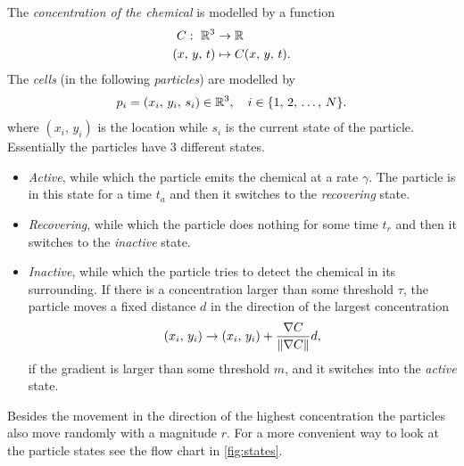 \documentclass{class}
\begin{document}
The \emph{concentration of the chemical} is modelled by a function
\begin{align*}
    C:\ 
    \R^3&\to\R\\
    (x,\,y,\,t)&\mapsto C(x,\,y,\,t).
\end{align*}
The \emph{cells} (in the following \emph{particles}) are modelled by
\begin{align*}
    p_i=(x_i,\,y_i,\,s_i)\in\mathbb{R}^3,\quad i\in\{1,\,2,\,\ldots,\,N\}.
\end{align*}
where $(x_i,\,y_i)$ is the location while $s_i$ is the current state of the particle.
Essentially the particles have 3 different states.
\begin{itemize}
    \item \emph{Active}, while which the particle emits the chemical at a rate $\gamma$.
          The particle is in this state for a time $t_a$ and then it switches to the \emph{recovering} state.
    \item \emph{Recovering}, while which the particle does nothing for some time $t_r$ and then it switches to the
          \emph{inactive} state.
    \item \emph{Inactive}, while which the particle tries to detect the chemical in its surrounding.
          If there is a concentration larger than some threshold $\tau$, the particle moves a fixed distance $d$ in the direction of the largest concentration
          \begin{align*}
              (x_i,\,y_i)\rightarrow(x_i,\,y_i)+\frac{\nabla C}{\norm{\nabla C}}d,
          \end{align*}
          if the gradient is larger than some threshold $m$, and it switches into the \emph{active} state.
\end{itemize}
Besides the movement in the direction of the highest concentration the particles also move randomly with a magnitude $r$.
For a more convenient way to look at the particle states see the flow chart in \autoref{fig:states}.
\end{document}
